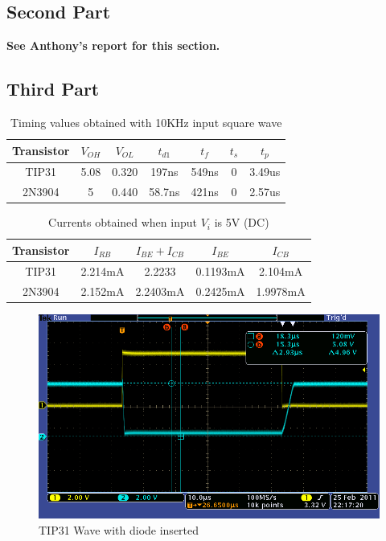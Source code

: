\documentclass[10pt]{article}
\begin{document}
	\subsection{Second Part}
	\textbf{See Anthony's report for this section.}

	\subsection{Third Part}
		\begin{table}[H]
			\centering
			\begin{tabular}{*{6}{c|}c}
			Transistor & $V_{OH}$ & $V_{OL}$ & $t_{d1}$ & $t_f$ & $t_s$ & $t_p$
			\\ \hline

			TIP31 & 5.08 & 0.320 & 197ns & 549ns & 0 & 3.49us \\

			2N3904 & 5 & 0.440 & 58.7ns & 421ns & 0 & 2.57us \\

			\end{tabular}
			\caption{Timing values obtained with 10KHz input square wave}
		\end{table}

		\begin{table}[H]
			\centering
			\begin{tabular}{*{4}{c|}c}
				Transistor & $I_{RB}$ & $I_{BE} + I_{CB}$ & $I_{BE}$ & $I_{CB}$ \\ \hline
				TIP31  & 2.214mA & 2.2233 & 0.1193mA & 2.104mA \\
				2N3904 & 2.152mA & 2.2403mA & 0.2425mA & 1.9978mA \\
			\end{tabular}
			\caption{Currents obtained when input $V_i$ is 5V (DC)}
			\label{tbl:3}
		\end{table}

		\begin{figure}[H]
			\centering
			\includegraphics[width=4.5in]{wave_3_tip31.png}
			\caption{TIP31 Wave with diode inserted}
			\label{fig:tip31-3}
		\end{figure}
\end{document}
